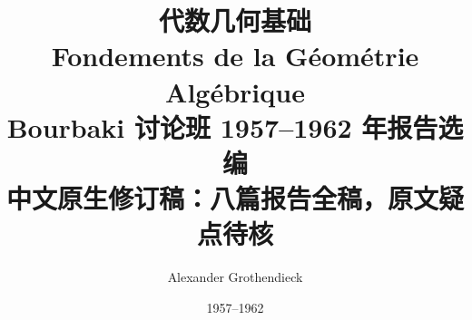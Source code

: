 \newenvironment{definition}[2][]%
  {\begin{inenv}[#1]{#2}{定义}{}}%
  {\end{inenv}}
\newenvironment{remark}[2][]%
  {\begin{inenv}[#1]{#2}{注}{}}%
  {\end{inenv}}
\newenvironment{remarks}[2][]%
  {\begin{inenv}[#1]{#2}{注}{}}%
  {\end{inenv}}
\newenvironment{example}[2][]%
  {\begin{inenv}[#1]{#2}{例}{}}%
  {\end{inenv}}
\newenvironment{scholium}[2][]%
  {\begin{inenv}[#1]{#2}{评注}{}}%
  {\end{inenv}}

\renewcommand{\proofname}{证明}

\renewcommand{\contentsname}{目录}


\renewcommand\thesubsection{\thesection.\alph{subsection}}

\newcommand\fgaAnchorPrefix{front}
\renewcommand\theHpart{\fgaAnchorPrefix.\arabic{part}}
\renewcommand\theHchapter{\fgaAnchorPrefix.\arabic{chapter}}
\renewcommand\theHsection{\theHchapter.\arabic{section}}
\renewcommand\theHsubsection{\theHsection.\arabic{subsection}}
\renewcommand\theHequation{\fgaAnchorPrefix.\arabic{chapter}.\arabic{equation}}


\usepackage{Baskervaldx}
\AtEndPreamble{\setmainfont{Baskervaldx-Reg.otf}[BoldFont=Baskervaldx-Bol.otf,ItalicFont=Baskervaldx-Ita.otf,BoldItalicFont=Baskervaldx-BolIta.otf]}

\title{代数几何基础\\[0.5em]\large Fondements de la Géométrie Algébrique\\[0.5em]\normalsize Bourbaki 讨论班 1957--1962 年报告选编\\[1em]中文原生修订稿：八篇报告全稿，原文疑点待核}
\author{Alexander Grothendieck}
\date{1957--1962}

